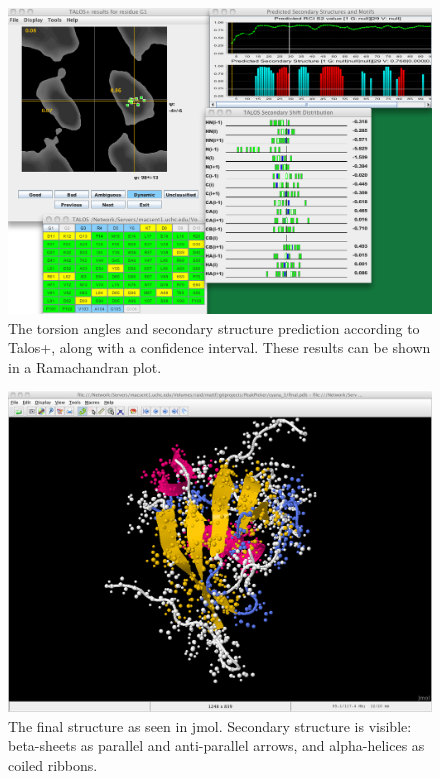 \begin{figure}
  \includegraphics[scale=0.25]{figures/talos+_results}
  \caption[The secondary structure prediction according to Talos+.]
          {The torsion angles and secondary structure prediction 
           according to Talos+, along with a confidence interval.  
           These results can be shown in a Ramachandran plot.}
  \label{talos+_results}
\end{figure}

\begin{figure}
  \includegraphics[scale=0.25]{figures/structure}
  \caption[The final structure as seen in jmol.]
          {The final structure as seen in jmol.
           Secondary structure is visible: beta-sheets as parallel and
           anti-parallel arrows, and alpha-helices as coiled ribbons.}
  \label{structure}
\end{figure}


